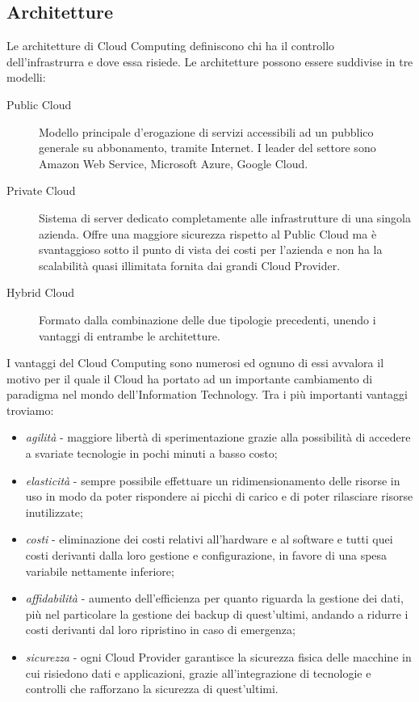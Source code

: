 \subsection{Architetture}
Le architetture di Cloud Computing definiscono chi ha il controllo dell'infrastrurra e dove essa risiede. Le architetture possono essere suddivise in tre modelli:
\begin{description}
    \item[Public Cloud]Modello principale d'erogazione di servizi accessibili ad un pubblico generale su abbonamento, tramite Internet. I leader del settore sono Amazon Web Service, Microsoft Azure, Google Cloud. 
    \item[Private Cloud]Sistema di server dedicato completamente alle infrastrutture di una singola azienda. Offre una maggiore sicurezza rispetto al Public Cloud ma è svantaggioso sotto il punto di vista dei costi per l'azienda e non ha la scalabilità quasi illimitata fornita dai grandi Cloud Provider.
    \item[Hybrid Cloud]Formato dalla combinazione delle due tipologie precedenti, unendo i vantaggi di entrambe le architetture.

\end{description}    
I vantaggi del Cloud Computing sono numerosi ed ognuno di essi avvalora il motivo per il quale il Cloud ha portato ad un importante cambiamento di paradigma nel mondo dell'Information Technology. Tra i più importanti vantaggi troviamo:
\begin{itemize}
    
    \item \textit{agilità} - maggiore libertà di sperimentazione grazie alla possibilità di accedere a svariate tecnologie in pochi minuti a basso costo;
    \item \textit{elasticità} - sempre possibile effettuare un ridimensionamento delle risorse in uso in modo da poter rispondere ai picchi di carico e di poter rilasciare risorse inutilizzate;
    \item \textit{costi} - eliminazione dei costi relativi all'hardware e al software e tutti quei costi derivanti dalla loro gestione e configurazione, in favore di una spesa variabile nettamente inferiore;
    \item \textit{affidabilità} - aumento dell'efficienza per quanto riguarda la gestione dei dati, più nel particolare la gestione dei backup di quest'ultimi, andando a ridurre i costi derivanti dal loro ripristino in caso di emergenza;
    \item \textit{sicurezza} - ogni Cloud Provider garantisce la sicurezza fisica delle macchine in cui risiedono dati e applicazioni, grazie all'integrazione di tecnologie e controlli che rafforzano la sicurezza di quest'ultimi.

\end{itemize}

